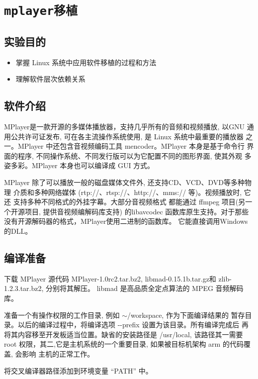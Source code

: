 \chapter{\tt mplayer移植}
\section{实验目的}
\begin{itemize}\itemsep=-3pt
  \item 掌握 Linux 系统中应用软件移植的过程和方法
  \item 理解软件层次依赖关系
\end{itemize}

\section{软件介绍}

	MPlayer是一款开源的多媒体播放器，支持几乎所有的音频和视频播放, 以GNU
通用公共许可证发布, 可在各主流操作系统使用, 是 Linux 系统中最重要的播放器
之一。MPlayer 中还包含音视频编码工具 mencoder。MPlayer 本身是基于命令行
界面的程序, 不同操作系统、不同发行版可以为它配置不同的图形界面, 使其外观
多姿多彩。MPlayer 本身也可以编译成 GUI 方式。

	MPlayer 除了可以播放一般的磁盘媒体文件外, 还支持CD、VCD、DVD等多种物理
介质和多种网络媒体 (rtp://、rtsp://、http://、mms:// 等)。视频播放时, 它还
支持多种不同格式的外挂字幕。大部分音视频格式
都能通过 ffmpeg 项目(另一个开源项目, 提供音视频编解码库支持) 的libavcodec
函数库原生支持。对于那些没有开源解码器的格式，MPlayer使用二进制的函数库。
它能直接调用Windows的DLL。

\section{编译准备}

	下载 MPlayer 源代码 MPlayer-1.0rc2.tar.bz2, libmad-0.15.1b.tar.gz和
 zlib-1.2.3.tar.bz2, 分别将其解压。
 libmad 是高品质全定点算法的 MPEG 音频解码库。

	准备一个有操作权限的工作目录, 例如 $\sim$/workspace, 作为下面编译结果的
暂存目录。以后的编译过程中，将编译选项 -{}-prefix 设置为该目录。所有编译完成后
再将其内容移至开发板适当位置。缺省的安装路径是 /usr/local, 该路径其一需要root
权限，其二,它是主机系统的一个重要目录, 如果被目标机架构 arm 的代码覆盖, 会影响
主机的正常工作。

	将交叉编译器路径添加到环境变量 ``PATH'' 中。

